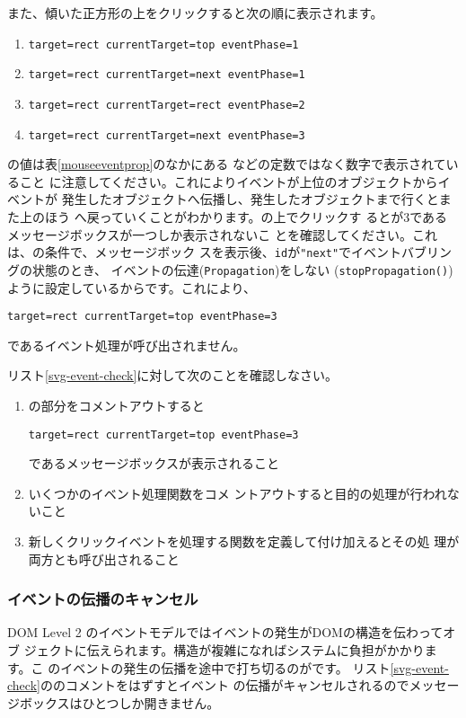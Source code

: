 また、傾いた正方形の上をクリックすると次の順に表示されます。
\begin{enumerate}
 \item \texttt{target=rect currentTarget=top eventPhase=1}
 \item \texttt{target=rect currentTarget=next eventPhase=1}
 \item \texttt{target=rect currentTarget=rect eventPhase=2}
 \item \texttt{target=rect currentTarget=next eventPhase=3}
\end{enumerate}
の値は表\ref{mouseeventprop}のなかにある
などの定数ではなく数字で表示されていること
に注意してください。これによりイベントが上位のオブジェクトからイベントが
発生したオブジェクトへ伝播し、発生したオブジェクトまで行くとまた上のほう
へ戻っていくことがわかります。の上でクリックす
るとが$3$であるメッセージボックスが一つしか表示されないこ
とを確認してください。これは、の条件で、メッセージボック
スを表示後、\texttt{id}が\texttt{"next"}でイベントバブリングの状態のとき、
イベントの伝達(\texttt{Propagation})をしない
(\texttt{stopPropagation()})ように設定しているからです。これにより、

\texttt{target=rect currentTarget=top eventPhase=3}

であるイベント処理が呼び出されません。
\begin{Problem}\upshape
リスト\ref{svg-event-check}に対して次のことを確認しなさい。
\begin{enumerate}
 \item {}の部分をコメントアウトすると

\texttt{target=rect currentTarget=top eventPhase=3}

であるメッセージボックスが表示されること
 \item いくつかのイベント処理関数をコメ
       ントアウトすると目的の処理が行われないこと
 \item 新しくクリックイベントを処理する関数を定義して付け加えるとその処
       理が両方とも呼び出されること
\end{enumerate}
\end{Problem}
\fi
\iffalse
\subsubsection{イベントの伝播のキャンセル}
DOM Level 2 のイベントモデルではイベントの発生がDOMの構造を伝わってオブ
ジェクトに伝えられます。構造が複雑になればシステムに負担がかかります。こ
のイベントの発生の伝播を途中で打ち切るのがです。
リスト\ref{svg-event-check}ののコメントをはずすとイベント
の伝播がキャンセルされるのでメッセージボックスはひとつしか開きません。

